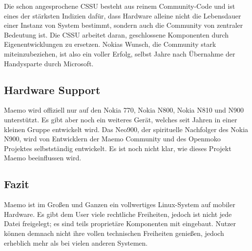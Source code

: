 Die schon angesprochene CSSU besteht aus reinem Community-Code und ist eines der stärksten Indizien dafür, dass Hardware alleine nicht die Lebensdauer einer Instanz von System bestimmt, sondern auch die Community von zentraler Bedeutung ist. Die CSSU arbeitet daran, geschlossene Komponenten durch Eigenentwicklungen zu ersetzen. Nokias Wunsch, die Community stark miteinzubeziehen, ist also ein voller Erfolg, selbst Jahre nach Übernahme der Handysparte durch Microsoft\thinspace\cite{online:nokia-microsoft}.
\newline

\subsection{Hardware Support}
Maemo wird offiziell nur auf den Nokia 770\thinspace\cite{online:maemo1-770}, Nokia N800\thinspace\cite{online:n800-specs}, Nokia N810\thinspace\cite{online:n810-specs} und N900\thinspace\cite{online:n900-specs} unterstützt. Es gibt aber noch ein weiteres Gerät, welches seit Jahren in einer kleinen Gruppe entwickelt wird. Das Neo900, der spirituelle Nachfolger des Nokia N900\thinspace\cite{online:maemo-neo900}, wird von Entwicklern der Maemo Community und des Openmoko Projektes selbstständig entwickelt\thinspace\cite{online:maemo-neo900team}. Es ist noch nicht klar, wie dieses Projekt Maemo beeinflussen wird.
\newline

\subsection{Fazit}
Maemo ist im Großen und Ganzen ein vollwertiges Linux-System auf mobiler Hardware. Es gibt dem User viele rechtliche Freiheiten, jedoch ist nicht jede Datei freigelegt; es sind teils proprietäre Komponenten   mit eingebaut. Nutzer können demnach nicht ihre vollen technischen Freiheiten genießen, jedoch erheblich mehr als bei vielen anderen Systemen.